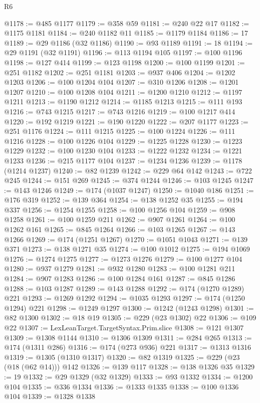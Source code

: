 \begin{lexlean}{R6}
\begin{coremodule}
@1178 := @485 @1177
@1179 := @358 @59
@1181 := @240 @22 @17
@1182 := @1175 @1181
@1184 := @240 @1182 @11
@1185 := @1179 @1184
@1186 := 17
@1189 := @29 @1186 (@32 @1186)
@1190 := @93 @1189
@1191 := 18
@1194 := @29 @1191 (@32 @1191)
@1196 := @113 @1194 @105
@1197 := @100 @1196
@1198 := @127 @414
@1199 := @123 @1198
@1200 := @100 @1199
@1201 := @251 @1182
@1202 := @251 @1181
@1203 := @937 @406
@1204 := @1202 @1203
@1206 := @100 @1204 @104
@1207 := @310 @1206
@1208 := @1201 @1207
@1210 := @100 @1208 @104
@1211 := @1200 @1210
@1212 := @1197 @1211
@1213 := @1190 @1212
@1214 := @1185 @1213
@1215 := @111 @193
@1216 := @743 @1215
@1217 := @743 @1216
@1219 := @100 @1217 @414
@1220 := @192 @1219
@1221 := @190 @1220
@1222 := @207 @1177
@1223 := @251 @1176
@1224 := @111 @1215
@1225 := @100 @1224
@1226 := @111 @1216
@1228 := @100 @1226 @104
@1229 := @1225 @1228
@1230 := @1223 @1229
@1232 := @100 @1230 @104
@1233 := @1222 @1232
@1234 := @1221 @1233
@1236 := @215 @1177 @104
@1237 := @1234 @1236
@1239 := @1178 (@1214 @1237)
@1240 := @82 @1239
@1242 := @229 @64 @142
@1243 := @722 @245
@1244 := @151 @269
@1245 := @374 @1244
@1246 := @103 @1245
@1247 := @143 @1246
@1249 := @174 (@1037 @1247)
@1250 := @1040 @186
@1251 := @176 @319
@1252 := @139 @364
@1254 := @138 @1252 @35
@1255 := @194 @337
@1256 := @1254 @1255
@1258 := @100 @1256 @104
@1259 := @908 @1258
@1261 := @100 @1259 @211
@1262 := @907 @1261
@1264 := @100 @1262 @161
@1265 := @845 @1264
@1266 := @103 @1265
@1267 := @143 @1266
@1269 := @174 (@1251 @1267)
@1270 := @1051 @1043
@1271 := @139 @371
@1273 := @138 @1271 @35
@1274 := @100 @1012
@1275 := @194 @1069
@1276 := @1274 @1275
@1277 := @1273 @1276
@1279 := @100 @1277 @104
@1280 := @937 @1279
@1281 := @932 @1280
@1283 := @100 @1281 @211
@1284 := @907 @1283
@1286 := @100 @1284 @161
@1287 := @845 @1286
@1288 := @103 @1287
@1289 := @143 @1288
@1292 := @174 (@1270 @1289) @221
@1293 := @1269 @1292
@1294 := @1035 @1293
@1297 := @174 (@1250 @1294) @221
@1298 := @1249 @1297
@1300 := @1242 (@1243 @1298)
@1301 := @82 @1300
@1302 := @18 @19
@1305 := @229 (@23 @1302) @22
@1306 := @109 @22
@1307 := LexLeanTarget.TargetSyntax.Prim.slice
@1308 := @121 @1307
@1309 := @1308 @1144
@1310 := @1306 @1309
@1311 := @284 @265
@1313 := @174 (@1311 @286)
@1316 := @174 (@273 @936) @221
@1317 := @1313 @1316
@1319 := @1305 (@1310 @1317)
@1320 := @82 @1319
@1325 := @229 (@23 (@18 (@62 @14))) @142
@1326 := @139 @117
@1328 := @138 @1326 @35
@1329 := 19
@1332 := @29 @1329 (@32 @1329)
@1333 := @93 @1332
@1334 := @1200 @104
@1335 := @336 @1334
@1336 := @1333 @1335
@1338 := @100 @1336 @104
@1339 := @1328 @1338

\end{coremodule}
\end{lexlean}
